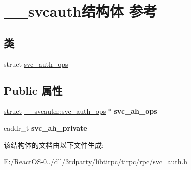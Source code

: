 \hypertarget{struct____svcauth}{}\section{\+\_\+\+\_\+svcauth结构体 参考}
\label{struct____svcauth}
\subsection*{类}
\begin{DoxyCompactItemize}
\item 
struct \hyperlink{struct____svcauth_1_1svc__auth__ops}{svc\+\_\+auth\+\_\+ops}
\end{DoxyCompactItemize}
\subsection*{Public 属性}
\begin{DoxyCompactItemize}
\item 
\mbox{\label{struct____svcauth_a7d9b127fb6b440665fafaffe652dff17}} 
\hyperlink{interfacestruct}{struct} \hyperlink{struct____svcauth_1_1svc__auth__ops}{\+\_\+\+\_\+svcauth\+::svc\+\_\+auth\+\_\+ops} $\ast$ {\bfseries svc\+\_\+ah\+\_\+ops}
\item 
\mbox{\label{struct____svcauth_a041b155c8aa525687ab25731a62f27a7}} 
caddr\+\_\+t {\bfseries svc\+\_\+ah\+\_\+private}
\end{DoxyCompactItemize}


该结构体的文档由以下文件生成\+:\begin{DoxyCompactItemize}
\item 
E\+:/\+React\+O\+S-\/0../dll/3rdparty/libtirpc/tirpc/rpc/svc\+\_\+auth.\+h\end{DoxyCompactItemize}
